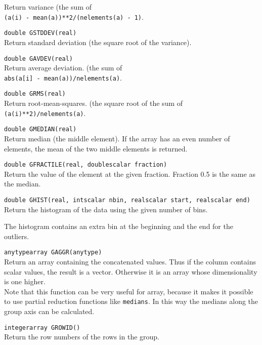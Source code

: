 \begin{description}
    Return variance (the sum of
    \\\texttt{(a(i) - mean(a))**2/(nelements(a) - 1)}.
  \item[] \texttt{double GSTDDEV(real)}\\
    Return standard deviation (the square root of the variance).
  \item[] \texttt{double GAVDEV(real)}\\
    Return average deviation. (the sum of
    \\\texttt{abs(a[i] - mean(a))/nelements(a)}.
  \item[] \texttt{double GRMS(real)}\\
    Return root-mean-squares. (the square root of the sum of
    \\\texttt{(a(i)**2)/nelements(a)}.
  \item[] \texttt{double GMEDIAN(real)}\\
    Return median (the middle element).
    If the array has an even number of elements, the mean of
    the two middle elements is returned.
  \item[] \texttt{double GFRACTILE(real, doublescalar fraction)}\\
    Return the value of the element at the given fraction.
    Fraction 0.5 is the same as the median.
  \item[] \texttt{double GHIST(real, intscalar nbin, realscalar start,
    realscalar end)}\\
    Return the histogram of the data using the given number of bins.
    
    The histogram contains an extra bin at the beginning and the end
    for the outliers. 
  \item[] \texttt{anytypearray GAGGR(anytype)}\\
    Return an array containing the concatenated values. Thus if the
    column contains scalar values, the result is a vector. Otherwise
    it is an array whose dimensionality is one higher.
    \\Note that this function can be very useful for array, because it
    makes it possible to use partial reduction functions like
    \texttt{medians}. In this way the medians along the group axis can
    be calculated. 
  \item[] \texttt{integerarray GROWID()}\\
    Return the row numbers of the rows in the group.
\end{description}


